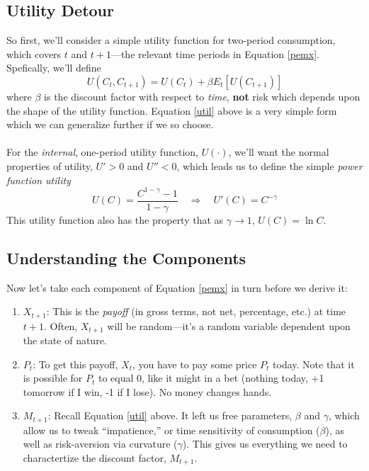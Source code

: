 \documentclass[a4paper,12pt]{scrartcl}
\begin{document}
\subsection{Utility Detour}

So first, we'll consider a simple utility function for two-period
consumption, which covers $t$ and $t+1$---the relevant time periods
in Equation \ref{pemx}. Spefically, we'll define
\begin{equation}
    \label{util}
    U(C_t, C_{t+1}) = U(C_t) + \beta E_t\left[U(C_{t+1})\right]
\end{equation}
where $\beta$ is the discount factor with respect to \emph{time},
\textbf{not} risk which depends upon the shape of the utility function.
Equation \ref{util} above is a very simple form which we can generalize
further if we so choose.
\\
\\
For the \emph{internal}, one-period utility function, $U(\cdot)$, we'll want
the normal properties of utility, $U'>0$ and $U''<0$, which leads
us to define the simple \emph{power function utility}
\begin{equation}
    \label{upwr}
    U(C) = \frac{C^{1-\gamma}-1}{1-\gamma} \quad\Rightarrow\quad
	U'(C) = C^{-\gamma}
\end{equation}
This utility function also has the property that as $\gamma\rightarrow 1$,
$U(C) = \ln C$.

\subsection{Understanding the Components}

Now let's take each component of Equation \ref{pemx} in turn
before we derive it:
\begin{enumerate}
    \item $X_{t+1}$: This is the \emph{payoff} (in gross
	terms, not net, percentage, etc.) at time $t+1$.  Often,
	$X_{t+1}$
	will be random---it's a random variable dependent upon
	the state of nature.
    \item $P_t$: To get this payoff, $X_t$, you have to pay some
	price $P_t$ today. Note that
	it is possible for $P_t$ to equal 0, like it might in a
	bet (nothing today, +1 tomorrow if I win, -1 if I lose).
	No money changes hands.
    \item $M_{t+1}$: Recall Equation \ref{util} above.  It left
	us free parameters, $\beta$ and $\gamma$, which allow us
	to tweak ``impatience,'' or time sensitivity of
	consumption ($\beta$), as well as risk-aversion via
	curvature ($\gamma$).
	This gives us everything we need to charactertize the
	discount factor, $M_{t+1}$.
\end{enumerate}
\end{document}
